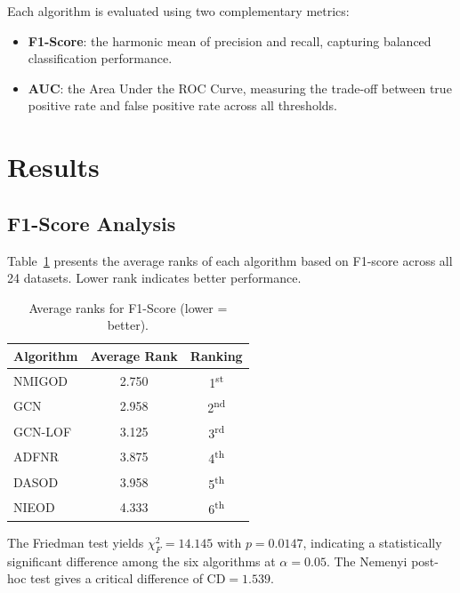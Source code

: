 \documentclass[11pt,a4paper]{article}
\begin{document}
Each algorithm is evaluated using two complementary metrics:
\begin{itemize}
  \item \textbf{F1-Score}: the harmonic mean of precision and recall, capturing
        balanced classification performance.
  \item \textbf{AUC}: the Area Under the ROC Curve, measuring the trade-off
        between true positive rate and false positive rate across all thresholds.
\end{itemize}

\section{Results}

\subsection{F1-Score Analysis}

Table~\ref{tab:f1-ranks} presents the average ranks of each algorithm based on
F1-score across all 24 datasets. Lower rank indicates better performance.

\begin{table}[htbp]
\centering
\caption{Average ranks for F1-Score (lower = better).}
\label{tab:f1-ranks}
\begin{tabular}{lcc}
\toprule
\textbf{Algorithm} & \textbf{Average Rank} & \textbf{Ranking} \\
\midrule
NMIGOD  & 2.750 & 1\textsuperscript{st} \\
GCN     & 2.958 & 2\textsuperscript{nd} \\
GCN-LOF & 3.125 & 3\textsuperscript{rd} \\
ADFNR   & 3.875 & 4\textsuperscript{th} \\
DASOD   & 3.958 & 5\textsuperscript{th} \\
NIEOD   & 4.333 & 6\textsuperscript{th} \\
\bottomrule
\end{tabular}
\end{table}

The Friedman test yields $\chi_F^2 = 14.145$ with $p = 0.0147$, indicating a
statistically significant difference among the six algorithms at
$\alpha = 0.05$. The Nemenyi post-hoc test gives a critical difference of
$\mathrm{CD} = 1.539$.
\end{document}
